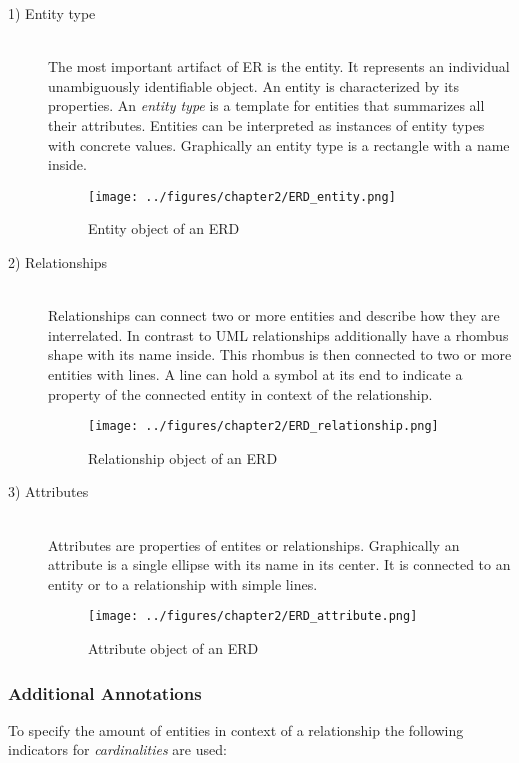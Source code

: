 \documentclass[twoside, openright, 12pt]{book}
\begin{document}
\begin{description}
\item[1) Entity type]\hfill \\
The most important artifact of ER is the entity.
It represents an individual unambiguously identifiable object.
An entity is characterized by its properties.
An \textit{entity type} is a template for entities that summarizes all their attributes.
Entities can be interpreted as instances of entity types with concrete values.
Graphically an entity type is a rectangle with a name inside.

\begin{figure}[htb]
	\centering
	\texttt{[image: ../figures/chapter2/ERD\_entity.png]}
	\caption{Entity object of an ERD}
	\label{fig:ERD_entity}
\end{figure}

\item[2) Relationships]\hfill \\
Relationships can connect two or more entities and describe how they are interrelated.
In contrast to UML relationships additionally have a rhombus shape with its name inside.
This rhombus is then connected to two or more entities with lines.
A line can hold a symbol at its end to indicate a property of the connected entity in context of the relationship.

\begin{figure}[htb]
	\centering
	\texttt{[image: ../figures/chapter2/ERD\_relationship.png]}
	\caption{Relationship object of an ERD}
	\label{fig:ERD_relationship}
\end{figure}

\item[3) Attributes]\hfill \\
Attributes are properties of entites or relationships.
Graphically an attribute is a single ellipse with its name in its center.
It is connected to an entity or to a relationship with simple lines.

\begin{figure}[htb]
	\centering
	\texttt{[image: ../figures/chapter2/ERD\_attribute.png]}
	\caption{Attribute object of an ERD}
	\label{fig:ERD_}
\end{figure}
\end{description}

\subsubsection{Additional Annotations}
\label{ER_additional_annotations}
To specify the amount of entities in context of a relationship the following indicators for \textit{cardinalities} are used:
\end{document}
